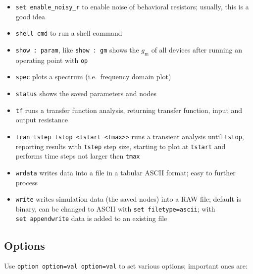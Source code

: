 \documentclass[
  a4paper,
  DIV=11,
  numbers=noendperiod]{scrartcl}
\begin{document}
\begin{itemize}
\item
  \texttt{set\ enable\_noisy\_r} to enable noise of behavioral
  resistors; usually, this is a good idea
\item
  \texttt{shell\ cmd} to run a shell command
\item
  \texttt{show\ :\ param}, like \texttt{show\ :\ gm} shows the
  \(g_\mathrm{m}\) of all devices after running an operating point with
  \texttt{op}
\item
  \texttt{spec} plots a spectrum (i.e.~frequency domain plot)
\item
  \texttt{status} shows the saved parameters and nodes
\item
  \texttt{tf} runs a transfer function analysis, returning transfer
  function, input and output resistance
\item
  \texttt{tran\ tstep\ tstop\ \textless{}tstart\ \textless{}tmax\textgreater{}\textgreater{}}
  runs a transient analysis until \texttt{tstop}, reporting results with
  \texttt{tstep} step size, starting to plot at \texttt{tstart} and
  performs time steps not larger then \texttt{tmax}
\item
  \texttt{wrdata} writes data into a file in a tabular ASCII format;
  easy to further process
\item
  \texttt{write} writes simulation data (the saved nodes) into a RAW
  file; default is binary, can be changed to ASCII with
  \texttt{set\ filetype=ascii}; with \texttt{set\ appendwrite} data is
  added to an existing file
\end{itemize}

\subsection{Options}\label{options}

Use \texttt{option\ option=val\ option=val} to set various options;
important ones are:
\end{document}

